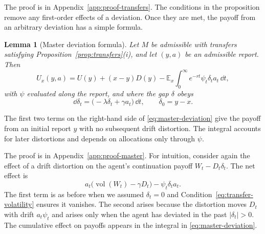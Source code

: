 \documentclass[12pt]{article}
\newtheorem{lemma}{Lemma}
\DeclareMathOperator{\vol}{vol}
\newcommand{\E}{\mathbb{E}}
\begin{document}
The proof is in
Appendix~\ref{app:proof-transfers}. The conditions in the proposition remove any first-order effects of a deviation. Once they are met, the payoff from an arbitrary deviation has a simple formula.

\begin{lemma}[Master deviation formula]\label{lem:master}
Let \(M\) be admissible with transfers satisfying
Proposition~\ref{prop:transfers}\textnormal{(i)}, and let \((y,a)\) be
an admissible report. Then
\begin{equation}\label{eq:master-deviation}
  U_x(y,a)
  =
  U(y)+(x-y)D(y)
  -\E_x\int_0^\infty e^{-rt}
    \psi_t\delta_ta_t\,\dd t,
\end{equation}
with \(\psi\) evaluated along the report, and where the gap $\delta$ obeys
\[
  \dd\delta_t
  =
  \bigl(-\lambda\delta_t+\gamma a_t\bigr)\,\dd t,
  \qquad
  \delta_0=y-x.
\]
\end{lemma}

The first two terms on the right-hand side of \eqref{eq:master-deviation} give the payoff from an initial report \(y\)
with no subsequent drift distortion. The integral accounts for later
distortions and depends on allocations only through \(\psi\).

The proof is in Appendix~\ref{app:proof-master}. For intuition, consider again the effect of a drift distortion on the agent's continuation payoff $W_t-D_t\delta_t$. The net effect is
\[
    a_t\bigl(\vol(W_t)-\gamma D_t\bigr)
    -\psi_t\delta_ta_t
.
\]
The first term is as before when we assumed $\delta_t=0$ and
Condition~\eqref{eq:transfer-volatility} ensures it vanishes. The
second arises because the distortion moves \(D_t\) with drift $a_t\psi_t$ and arises only when the agent has deviated in the past $|\delta_t| > 0$. The cumulative effect on payoffs appears in the integral in \eqref{eq:master-deviation}. 
\end{document}
